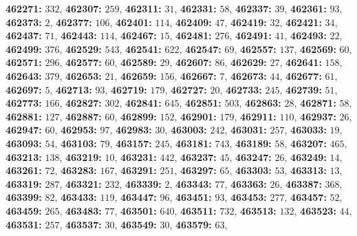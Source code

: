 \textsf{\bfseries 462271:} $332$, \textsf{\bfseries 462307:} $259$, \textsf{\bfseries 462311:} $31$, \textsf{\bfseries 462331:} $58$, \textsf{\bfseries 462337:} $39$, \textsf{\bfseries 462361:} $93$, \textsf{\bfseries 462373:} $2$, \textsf{\bfseries 462377:} $106$, \textsf{\bfseries 462401:} $114$, \textsf{\bfseries 462409:} $47$, \textsf{\bfseries 462419:} $32$, \textsf{\bfseries 462421:} $34$, \textsf{\bfseries 462437:} $71$, \textsf{\bfseries 462443:} $114$, \textsf{\bfseries 462467:} $15$, \textsf{\bfseries 462481:} $276$, \textsf{\bfseries 462491:} $41$, \textsf{\bfseries 462493:} $22$, \textsf{\bfseries 462499:} $376$, \textsf{\bfseries 462529:} $543$, \textsf{\bfseries 462541:} $622$, \textsf{\bfseries 462547:} $69$, \textsf{\bfseries 462557:} $137$, \textsf{\bfseries 462569:} $60$, \textsf{\bfseries 462571:} $296$, \textsf{\bfseries 462577:} $60$, \textsf{\bfseries 462589:} $29$, \textsf{\bfseries 462607:} $86$, \textsf{\bfseries 462629:} $27$, \textsf{\bfseries 462641:} $158$, \textsf{\bfseries 462643:} $379$, \textsf{\bfseries 462653:} $21$, \textsf{\bfseries 462659:} $156$, \textsf{\bfseries 462667:} $7$, \textsf{\bfseries 462673:} $44$, \textsf{\bfseries 462677:} $61$, \textsf{\bfseries 462697:} $5$, \textsf{\bfseries 462713:} $93$, \textsf{\bfseries 462719:} $179$, \textsf{\bfseries 462727:} $20$, \textsf{\bfseries 462733:} $245$, \textsf{\bfseries 462739:} $51$, \textsf{\bfseries 462773:} $166$, \textsf{\bfseries 462827:} $302$, \textsf{\bfseries 462841:} $645$, \textsf{\bfseries 462851:} $503$, \textsf{\bfseries 462863:} $28$, \textsf{\bfseries 462871:} $58$, \textsf{\bfseries 462881:} $127$, \textsf{\bfseries 462887:} $60$, \textsf{\bfseries 462899:} $152$, \textsf{\bfseries 462901:} $179$, \textsf{\bfseries 462911:} $110$, \textsf{\bfseries 462937:} $26$, \textsf{\bfseries 462947:} $60$, \textsf{\bfseries 462953:} $97$, \textsf{\bfseries 462983:} $30$, \textsf{\bfseries 463003:} $242$, \textsf{\bfseries 463031:} $257$, \textsf{\bfseries 463033:} $19$, \textsf{\bfseries 463093:} $54$, \textsf{\bfseries 463103:} $79$, \textsf{\bfseries 463157:} $245$, \textsf{\bfseries 463181:} $743$, \textsf{\bfseries 463189:} $58$, \textsf{\bfseries 463207:} $465$, \textsf{\bfseries 463213:} $138$, \textsf{\bfseries 463219:} $10$, \textsf{\bfseries 463231:} $442$, \textsf{\bfseries 463237:} $45$, \textsf{\bfseries 463247:} $26$, \textsf{\bfseries 463249:} $14$, \textsf{\bfseries 463261:} $72$, \textsf{\bfseries 463283:} $167$, \textsf{\bfseries 463291:} $251$, \textsf{\bfseries 463297:} $65$, \textsf{\bfseries 463303:} $53$, \textsf{\bfseries 463313:} $13$, \textsf{\bfseries 463319:} $287$, \textsf{\bfseries 463321:} $232$, \textsf{\bfseries 463339:} $2$, \textsf{\bfseries 463343:} $77$, \textsf{\bfseries 463363:} $26$, \textsf{\bfseries 463387:} $368$, \textsf{\bfseries 463399:} $82$, \textsf{\bfseries 463433:} $119$, \textsf{\bfseries 463447:} $96$, \textsf{\bfseries 463451:} $93$, \textsf{\bfseries 463453:} $277$, \textsf{\bfseries 463457:} $52$, \textsf{\bfseries 463459:} $265$, \textsf{\bfseries 463483:} $77$, \textsf{\bfseries 463501:} $640$, \textsf{\bfseries 463511:} $732$, \textsf{\bfseries 463513:} $132$, \textsf{\bfseries 463523:} $44$, \textsf{\bfseries 463531:} $257$, \textsf{\bfseries 463537:} $30$, \textsf{\bfseries 463549:} $30$, \textsf{\bfseries 463579:} $63$, 
